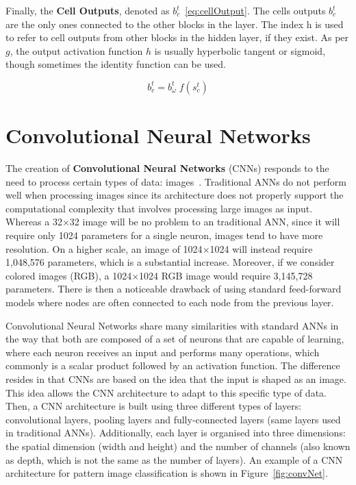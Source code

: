 Finally, the \textbf{Cell Outputs}, denoted as $b_c^t$~\ref{eq:cellOutput}. The cells outputs $b_c^t$ 
are the only ones connected to the other blocks in the layer. The index h is used to refer 
to cell outputs from other blocks in the hidden layer, if they exist. As per $g$, the output 
activation function $h$ is usually hyperbolic tangent or sigmoid, though sometimes the 
identity function can be used. 

\begin{equation} \label{eq:cellOutput}
    b_c^t = b_\omega^t \; f(s_c^t)
\end{equation}


\section{Convolutional Neural Networks}
\label{appendix:neuralNetworks/cnn}
The creation of \textbf{Convolutional Neural Networks} (CNNs) responds to the need to process 
certain types of data: images~\cite{appendix:OSheaN15}. Traditional ANNs do not perform well 
when processing images since its architecture does not properly support the computational 
complexity that involves processing large images as input. Whereas a 32$\times$32 image will 
be no problem to an traditional ANN, since it will require only 1024 parameters for a single 
neuron, images tend to have more resolution. On a higher scale, an image of 1024$\times$1024 
will instead require 1,048,576 parameters, which is a substantial increase. Moreover, if we 
consider colored images (RGB), a 1024$\times$1024 RGB image would require 3,145,728 
parameters. There is then a noticeable drawback of using standard feed-forward models where 
nodes are often connected to each node from the previous layer.

Convolutional Neural Networks share many similarities with standard ANNs in the way that both 
are composed of a set of neurons that are capable of learning, where each neuron receives an 
input and performs many operations, which commonly is a scalar product followed by an 
activation function. The difference resides in that CNNs are based on the idea that the input 
is shaped as an image. This idea allows the CNN architecture to adapt to this specific type 
of data. Then, a CNN architecture is built using three different types of layers: 
convolutional layers, pooling layers and fully-connected layers (same layers used in 
traditional ANNs). Additionally, each layer is organised into three dimensions: the spatial 
dimension (width and height) and the number of channels (also known as depth, which is not 
the same as the number of layers). An example of a CNN architecture for pattern image 
classification is shown in Figure~\ref{fig:convNet}.

